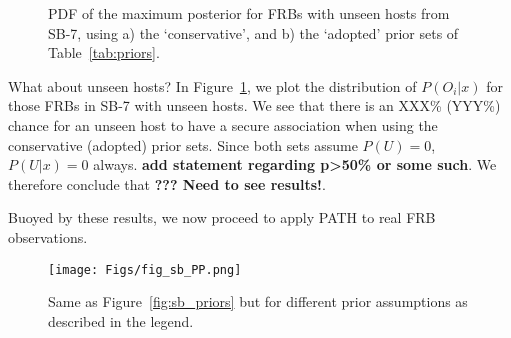 \documentclass[twocolumn,linenumbers]{aastex63}
\newcommand{\mpoffset}{p(\omega|O_i)}  %
\newcommand{\poffset}{$\mpoffset$}
\newcommand{\mPO}{P(O)}  %
\newcommand{\PO}{$\mPO$}
\newcommand{\mPOix}{P(O_i|x)}  %
\begin{document}
\begin{figure}[!ht]
\centering
    \caption{PDF of the maximum posterior for FRBs with unseen hosts from SB-7,
    using a) the `conservative', and b) the `adopted' prior sets of Table~\ref{tab:priors}.
    }
	\label{fig:sb_post_unseen}
\end{figure}

What about unseen hosts? In Figure~\ref{fig:sb_post_unseen}, we plot the distribution of $\mPOix$ for those FRBs in SB-7 with unseen hosts. We see that there is an XXX\% (YYY\%) chance for an unseen host to have a secure association when using the conservative (adopted) prior sets. Since both sets assume $P(U)=0$, $P(U|x)=0$ always. {\bf add statement regarding p>50\% or some such}. We therefore conclude that {\bf ??? Need to see results!}.


Buoyed by these results, we now proceed to apply PATH
to real FRB observations.




%
%

\begin{figure}[!ht]
\centering
    \texttt{[image: Figs/fig\_sb\_PP.png]}
    \caption{
    Same as Figure~\ref{fig:sb_priors}
    but for different prior assumptions as described
    in the legend.
    }
	\label{fig:sb_punchline}
\end{figure}
\end{document}
